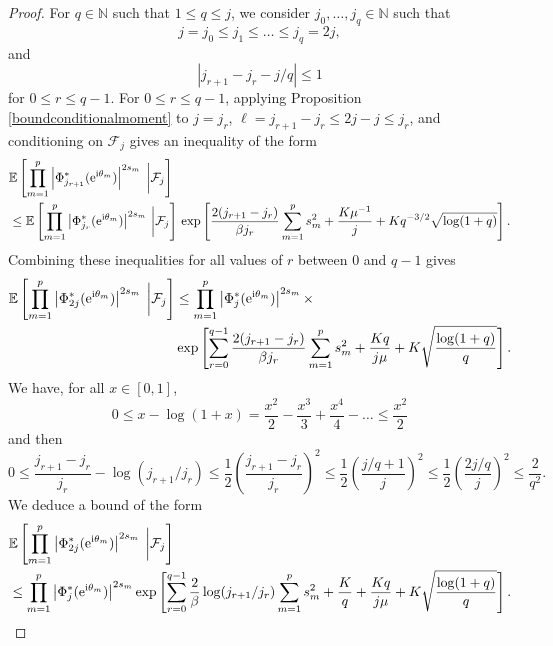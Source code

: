 \documentclass[]{article}
\begin{document}
\begin{proof}
For $q\in \mathbb{N}$ such that $1 \leq q \leq j$, we consider $j_0, \dots, j_q \in \mathbb{N}$ such that 
$$j = j_0 \leq j_1 \leq \dots \leq j_q = 2j,$$
and 
$$|j_{r + 1} - j_r - j/q| \leq 1$$
for $0 \leq r \leq q-1$. 
For $0 \leq r \leq q-1$, applying Proposition \ref{boundconditionalmoment}
to $j = j_r$, $\ell = j_{r+1} - j_r \leq 2j - j \leq j_r$, and conditioning on $\mathcal{F}_j$ gives 
an inequality of the form
\begin{align*}
& \mathbb{E} \left[ \prod_{m=1}^p \left|\Phi^*_{j_{r+1}} (\mathrm{e}^{\textnormal{i} \theta_m})
\right|^{2s_m} \;  \bigg| \mathcal{F}_j \right]
\\ & \leq \mathbb{E} \left[ \prod_{m=1}^p \left|\Phi^*_{j_r} (\mathrm{e}^{\textnormal{i} \theta_m})
\right|^{2s_m} \, \bigg| \mathcal{F}_j \right] \, \exp \left[ 
\frac{2 (j_{r+1}-j_r)}{\beta j_r}  
 \sum_{m=1}^{p} s_m^2 
+ \frac{K \mu^{-1}}{j} 
+ K q^{-3/2}   \sqrt{\log (1 +q)}    
\right].
\end{align*}
Combining these inequalities for all values of $r$ between $0$ and $q-1$ gives
\begin{align*}
\mathbb{E} \left[ \prod_{m=1}^p \left|\Phi^*_{2j} (\mathrm{e}^{\textnormal{i} \theta_m})
\right|^{2s_m} \;  \bigg| \mathcal{F}_j \right]
&\leq \prod_{m=1}^p \left|\Phi^*_{j} (\mathrm{e}^{\textnormal{i} \theta_m})
\right|^{2s_m} \times \\ 
&\exp \left[ 
\sum_{r = 0}^{q-1}\frac{2 (j_{r+1}-j_r)}{\beta j_r}  
 \sum_{m=1}^{p} s_m^2 
+ \frac{K q }{j \mu} 
+ K    \sqrt{\frac{\log (1 +q)}{q}}    
\right]. 
\end{align*}
We have, for all $x \in [0,1]$, 
$$0 \leq x - \log(1+x) = \frac{x^2}{2} 
- \frac{x^3}{3} + \frac{x^4}{4} - \dots 
\leq \frac{x^2}{2}
$$
and then 
$$0 \leq \frac{j_{r+1}-j_r}{j_r} - \log (j_{r+1}/j_r)
\leq \frac{1}{2} \left(\frac{j_{r+1}- j_r}{j_r} \right)^2 
\leq \frac{1}{2}\left(\frac{j/q + 1}{j} \right)^2
\leq \frac{1}{2}\left(\frac{2j/q}{j} \right)^2
\leq \frac{2}{q^2}.$$
We deduce a bound of the form
\begin{align*}
& \mathbb{E} \left[ \prod_{m=1}^p \left|\Phi^*_{2j} (\mathrm{e}^{\textnormal{i} \theta_m})
\right|^{2s_m} \;  \bigg| \mathcal{F}_j \right] \\ & 
\leq \prod_{m=1}^p \left|\Phi^*_{j} (\mathrm{e}^{\textnormal{i} \theta_m})
\right|^{2s_m} \exp \left[ 
\sum_{r = 0}^{q-1}\frac{2}{\beta} \log (j_{r+1}/j_r)  
 \sum_{m=1}^{p} s_m^2 
+ \frac{K}{q} + \frac{K q }{j \mu} 
+ K    \sqrt{\frac{\log (1 +q)}{q}}    
\right].

\end{align*}
\end{proof}
\end{document}
